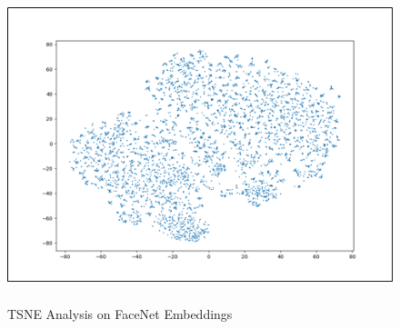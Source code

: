 \documentclass[12pt]{article}
\renewcommand{\_}{\kern-1.5pt\textunderscore\kern-1.5pt}
\begin{document}
\vspace{\baselineskip}
\begin{Center}



\begin{figure}[H]
	\begin{Center}
		\includegraphics[width=5.09in,height=3.6in]{./media/image8.png}
		\caption{TSNE Analysis on FaceNet Embeddings}
		\label{fig:TSNE_Analysis_on_FaceNet_Embeddings}
	\end{Center}
\end{figure}



\\

\end{Center}\par
\end{document}
